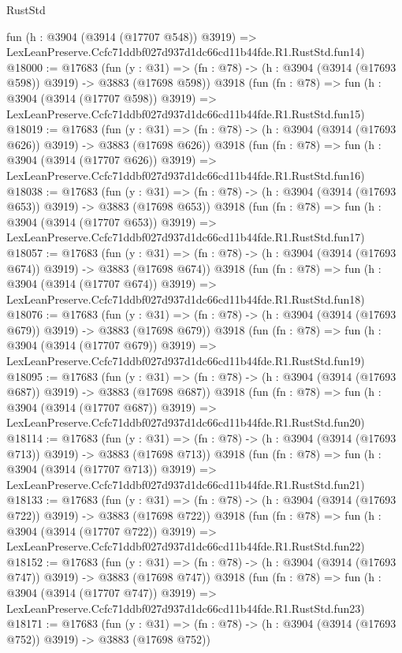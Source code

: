 \begin{lexlean}{RustStd}
\begin{coremodule}
    fun (h : @3904 (@3914 (@17707 @548)) @3919) =>
    LexLeanPreserve.Ccfc71ddbf027d937d1dc66cd11b44fde.R1.RustStd.fun14)
@18000 := @17683
    (fun (y : @31) => (fn : @78) -> (h : @3904 (@3914 (@17693 @598)) @3919) -> @3883 (@17698 @598))
    @3918
    (fun (fn : @78) =>
    fun (h : @3904 (@3914 (@17707 @598)) @3919) =>
    LexLeanPreserve.Ccfc71ddbf027d937d1dc66cd11b44fde.R1.RustStd.fun15)
@18019 := @17683
    (fun (y : @31) => (fn : @78) -> (h : @3904 (@3914 (@17693 @626)) @3919) -> @3883 (@17698 @626))
    @3918
    (fun (fn : @78) =>
    fun (h : @3904 (@3914 (@17707 @626)) @3919) =>
    LexLeanPreserve.Ccfc71ddbf027d937d1dc66cd11b44fde.R1.RustStd.fun16)
@18038 := @17683
    (fun (y : @31) => (fn : @78) -> (h : @3904 (@3914 (@17693 @653)) @3919) -> @3883 (@17698 @653))
    @3918
    (fun (fn : @78) =>
    fun (h : @3904 (@3914 (@17707 @653)) @3919) =>
    LexLeanPreserve.Ccfc71ddbf027d937d1dc66cd11b44fde.R1.RustStd.fun17)
@18057 := @17683
    (fun (y : @31) => (fn : @78) -> (h : @3904 (@3914 (@17693 @674)) @3919) -> @3883 (@17698 @674))
    @3918
    (fun (fn : @78) =>
    fun (h : @3904 (@3914 (@17707 @674)) @3919) =>
    LexLeanPreserve.Ccfc71ddbf027d937d1dc66cd11b44fde.R1.RustStd.fun18)
@18076 := @17683
    (fun (y : @31) => (fn : @78) -> (h : @3904 (@3914 (@17693 @679)) @3919) -> @3883 (@17698 @679))
    @3918
    (fun (fn : @78) =>
    fun (h : @3904 (@3914 (@17707 @679)) @3919) =>
    LexLeanPreserve.Ccfc71ddbf027d937d1dc66cd11b44fde.R1.RustStd.fun19)
@18095 := @17683
    (fun (y : @31) => (fn : @78) -> (h : @3904 (@3914 (@17693 @687)) @3919) -> @3883 (@17698 @687))
    @3918
    (fun (fn : @78) =>
    fun (h : @3904 (@3914 (@17707 @687)) @3919) =>
    LexLeanPreserve.Ccfc71ddbf027d937d1dc66cd11b44fde.R1.RustStd.fun20)
@18114 := @17683
    (fun (y : @31) => (fn : @78) -> (h : @3904 (@3914 (@17693 @713)) @3919) -> @3883 (@17698 @713))
    @3918
    (fun (fn : @78) =>
    fun (h : @3904 (@3914 (@17707 @713)) @3919) =>
    LexLeanPreserve.Ccfc71ddbf027d937d1dc66cd11b44fde.R1.RustStd.fun21)
@18133 := @17683
    (fun (y : @31) => (fn : @78) -> (h : @3904 (@3914 (@17693 @722)) @3919) -> @3883 (@17698 @722))
    @3918
    (fun (fn : @78) =>
    fun (h : @3904 (@3914 (@17707 @722)) @3919) =>
    LexLeanPreserve.Ccfc71ddbf027d937d1dc66cd11b44fde.R1.RustStd.fun22)
@18152 := @17683
    (fun (y : @31) => (fn : @78) -> (h : @3904 (@3914 (@17693 @747)) @3919) -> @3883 (@17698 @747))
    @3918
    (fun (fn : @78) =>
    fun (h : @3904 (@3914 (@17707 @747)) @3919) =>
    LexLeanPreserve.Ccfc71ddbf027d937d1dc66cd11b44fde.R1.RustStd.fun23)
@18171 := @17683
    (fun (y : @31) => (fn : @78) -> (h : @3904 (@3914 (@17693 @752)) @3919) -> @3883 (@17698 @752))

\end{coremodule}
\end{lexlean}

